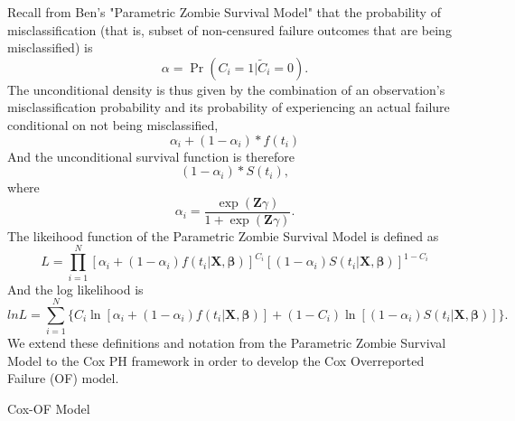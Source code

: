 \documentclass[a4paper, 12pt]{article}
\makeatletter
\renewcommand{\section}{\@startsection
{section}    {1}    {0mm}    {-0.7\baselineskip}    {0.08\baselineskip}    {\normalfont\large\sc\center\bf}}
\makeatother
\begin{document}
\noindent Recall from Ben's "Parametric Zombie Survival Model" that the
probability of misclassification (that is, subset of non-censured failure
outcomes that are being misclassified) is%
\begin{equation}
\alpha =\Pr (C_{i}=1|\widetilde{C}_{i}=0).
\end{equation}%
The unconditional density is thus given by the combination of an
observation's misclassification probability and its probability of
experiencing an actual failure conditional on not being misclassified,%
\begin{equation}
\alpha _{i}+(1-\alpha _{i})\ast f(t_{i})
\end{equation}%
And the unconditional survival function is therefore%
\begin{equation}
(1-\alpha _{i})\ast S(t_{i}),
\end{equation}%
where 
\begin{equation}
\alpha _{i}=\frac{\exp (\mathbf{Z}\gamma )}{1+\exp (\mathbf{Z}\gamma )}.
\end{equation}%
The likeihood function of the Parametric Zombie Survival Model is defined as 
\begin{equation}
L=\displaystyle\prod\limits_{i=1}^{N}[\alpha _{i}+(1-\alpha _{i})f(t_{i}|%
\mathbf{X},\mathbf{\beta })]^{C_{i}}[(1-\alpha _{i})S(t_{i}|\mathbf{X,}%
\mathbf{\beta })]^{1-C_{i}}
\end{equation}%
And the log likelihood is%
\begin{equation}
lnL=\displaystyle\sum\limits_{i=1}^{N}\{C_{i}\ln [\alpha _{i}+(1-\alpha
_{i})f(t_{i}|\mathbf{X},\mathbf{\beta })]+(1-C_{i})\ln [(1-\alpha
_{i})S(t_{i}|\mathbf{X,}\mathbf{\beta })]\}.
\end{equation}%
\iffalse Equivalently, if we define $\delta =1-\alpha $ and substitute this
quantity into Equation (6), the log-likelihood would be defined as: 
\begin{equation}
lnL=\displaystyle\sum\limits_{i=1}^{N}\{C_{i}\ln [(1-\delta _{i})+\delta
_{i}f(t_{i}|\mathbf{X},\mathbf{\beta })]+(1-C_{i})\ln [\delta _{i}S(t_{i}|%
\mathbf{X,}\mathbf{\beta })]\},
\end{equation}%
which is symmetric to the log likelihood of the cure (i.e.,
split-population) survival model. \fi We extend these definitions and
notation from the Parametric Zombie Survival Model to the Cox PH framework
in order to develop the Cox Overreported Failure (OF) model.

\section{Cox-OF Model}
\end{document}
